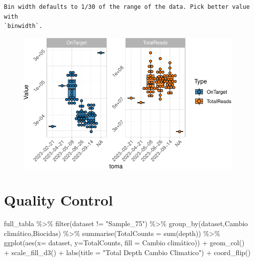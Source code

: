 \documentclass[
  letterpaper,
  DIV=11,
  numbers=noendperiod]{scrartcl}
\newenvironment{Shaded}{\begin{snugshade}}{\end{snugshade}}
\newcommand{\AttributeTok}[1]{\textcolor[rgb]{0.40,0.45,0.13}{#1}}
\newcommand{\FunctionTok}[1]{\textcolor[rgb]{0.28,0.35,0.67}{#1}}
\newcommand{\NormalTok}[1]{\textcolor[rgb]{0.00,0.23,0.31}{#1}}
\newcommand{\SpecialCharTok}[1]{\textcolor[rgb]{0.37,0.37,0.37}{#1}}
\newcommand{\StringTok}[1]{\textcolor[rgb]{0.13,0.47,0.30}{#1}}
\begin{document}
\begin{verbatim}
Bin width defaults to 1/30 of the range of the data. Pick better value with
`binwidth`.
\end{verbatim}

\begin{figure}[H]

{\centering \includegraphics{InformeNeiker_files/figure-pdf/unnamed-chunk-4-3.pdf}

}

\end{figure}

\hypertarget{quality-control}{%
\section{Quality Control}\label{quality-control}}

\begin{Shaded}
\begin{Highlighting}[]
\NormalTok{full\_tabla }\SpecialCharTok{\%\textgreater{}\%} \FunctionTok{filter}\NormalTok{(dataset }\SpecialCharTok{!=} \StringTok{"Sample\_75"}\NormalTok{) }\SpecialCharTok{\%\textgreater{}\%} 
  \FunctionTok{group\_by}\NormalTok{(dataset,}\StringTok{\textasciigrave{}}\AttributeTok{Cambio climático}\StringTok{\textasciigrave{}}\NormalTok{,Biocidas) }\SpecialCharTok{\%\textgreater{}\%} 
  \FunctionTok{summarise}\NormalTok{(}\AttributeTok{TotalCounts =} \FunctionTok{sum}\NormalTok{(depth)) }\SpecialCharTok{\%\textgreater{}\%} 
  \FunctionTok{ggplot}\NormalTok{(}\FunctionTok{aes}\NormalTok{(}\AttributeTok{x=}\NormalTok{ dataset, }\AttributeTok{y=}\NormalTok{TotalCounts, }\AttributeTok{fill =} \StringTok{\textasciigrave{}}\AttributeTok{Cambio climático}\StringTok{\textasciigrave{}}\NormalTok{)) }\SpecialCharTok{+} 
  \FunctionTok{geom\_col}\NormalTok{() }\SpecialCharTok{+}
  \FunctionTok{scale\_fill\_d3}\NormalTok{() }\SpecialCharTok{+}
  \FunctionTok{labs}\NormalTok{(}\AttributeTok{title =} \StringTok{"Total Depth Cambio Climatico"}\NormalTok{) }\SpecialCharTok{+}
  \FunctionTok{coord\_flip}\NormalTok{()}
\end{Highlighting}
\end{Shaded}
\end{document}
